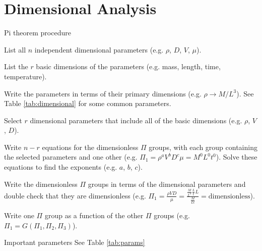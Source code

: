 \documentclass{article}
\begin{document}
\section{Dimensional Analysis}
\begin{description*}
\item[Pi theorem procedure]~
  \begin{enumerate*}
  \item List all $n$ independent dimensional parameters (e.g. $\rho$, $D$, $V$, $\mu$).
  \item List the $r$ basic dimensions of the parameters (e.g. mass, length, time, temperature).
  \item Write the parameters in terms of their primary dimensions (e.g. $\rho\rightarrow M/L^3$).
    See Table \ref{tab:dimensional} for some common parameters.
  \item Select $r$ dimensional parameters that include all of the basic dimensions
    (e.g. $\rho$, $V$, $D$).
  \item Write $n-r$ equations for the dimensionless $\Pi$ groups, with each group containing the
    selected parameters and one other (e.g. \(\Pi_1 = \rho^a V^b D^c \mu = M^0L^0t^0\)). Solve these
    equations to find the exponents (e.g. $a$, $b$, $c$).
  \item Write the dimensionless $\Pi$ groups in terms of the dimensional parameters and double check
    that they are dimensionless (e.g. \(\Pi_1 = \frac{\rho{}VD}{\mu}
    = \frac{\frac{M}{L^3}\frac{L}{t}L}{\frac{M}{Lt}} = \textrm{dimensionless}\)).
  \item Write one $\Pi$ group as a function of the other $\Pi$ groups
    (e.g. \(\Pi_1 = G(\Pi_1,\Pi_2,\Pi_3)\)).
  \end{enumerate*}
\item[Important parameters] See Table \ref{tab:params}
\end{description*}
\end{document}
